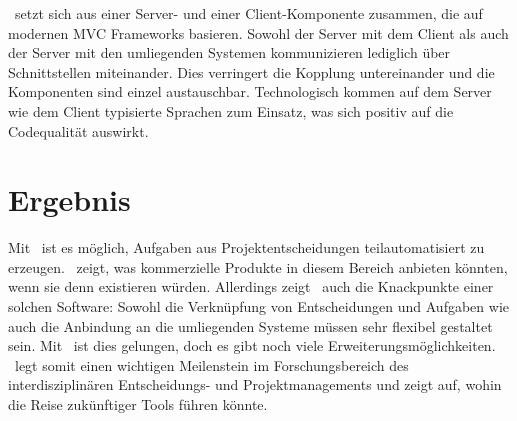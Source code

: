 	\eeppi\ setzt sich aus einer Server- und einer Client-Komponente zusammen, die auf modernen MVC Frameworks basieren.
	Sowohl der Server mit dem Client als auch der Server mit den umliegenden Systemen kommunizieren lediglich über Schnittstellen miteinander.
	Dies verringert die Kopplung untereinander und die Komponenten sind einzel austauschbar.
	Technologisch kommen auf dem Server wie dem Client typisierte Sprachen zum Einsatz, was sich positiv auf die Codequalität auswirkt.

	\section{Ergebnis}
	Mit \eeppi\ ist es möglich, Aufgaben aus Projektentscheidungen teilautomatisiert zu erzeugen.
	\eeppi\ zeigt, was kommerzielle Produkte in diesem Bereich anbieten könnten, wenn sie denn existieren würden.
	Allerdings zeigt \eeppi\ auch die Knackpunkte einer solchen Software:
	Sowohl die Verknüpfung von Entscheidungen und Aufgaben wie auch die Anbindung an die umliegenden Systeme müssen sehr flexibel gestaltet sein.
	Mit \eeppi\ ist dies gelungen, doch es gibt noch viele Erweiterungsmöglichkeiten.
	\eeppi\ legt somit einen wichtigen Meilenstein im Forschungsbereich des interdisziplinären Entscheidungs- und Projektmanagements und
	zeigt auf, wohin die Reise zukünftiger Tools führen könnte.

